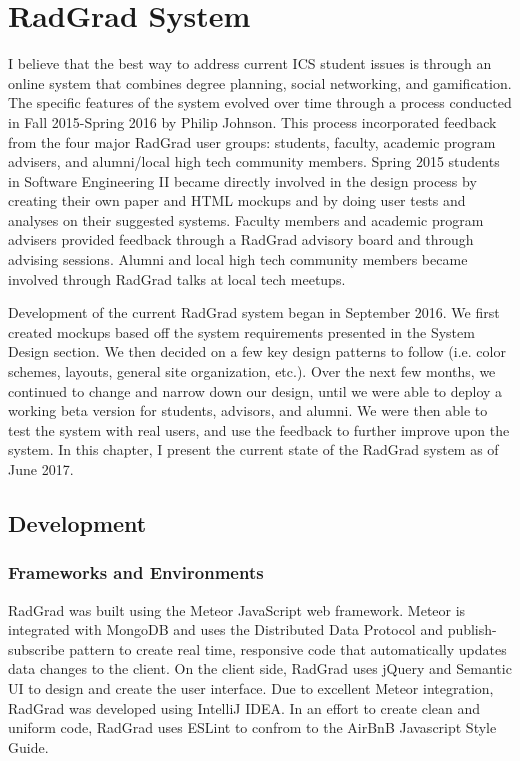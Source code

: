 \chapter{RadGrad System}
\label{radgrad-system}

I believe that the best way to address current ICS student issues is through an online system that combines degree planning, social networking, and gamification. The specific features of the system evolved over time through a process conducted in Fall 2015-Spring 2016 by Philip Johnson. This process incorporated feedback from the four major RadGrad user groups: students, faculty, academic program advisers, and alumni/local high tech community members. Spring 2015 students in Software Engineering II became directly involved in the design process by creating their own paper and HTML mockups and by doing user tests and analyses on their suggested systems. Faculty members and academic program advisers provided feedback through a RadGrad advisory board and through advising sessions. Alumni and local high tech community members became involved through RadGrad talks at local tech meetups. 

Development of the current RadGrad system began in September 2016. We first created mockups based off the system requirements presented in the System Design section. We then decided on a few key design patterns to follow (i.e. color schemes, layouts, general site organization, etc.). Over the next few months, we continued to change and narrow down our design, until we were able to deploy a working beta version for students, advisors, and alumni. We were then able to test the system with real users, and use the feedback to further improve upon the system. In this chapter, I present the current state of the RadGrad system as of June 2017.
\vspace{5mm}
\section{Development}
\subsection{Frameworks and Environments}

RadGrad was built using the Meteor JavaScript web framework. Meteor is integrated with MongoDB and uses the Distributed Data Protocol and publish-subscribe pattern to create real time, responsive code that automatically updates data changes to the client. On the client side, RadGrad uses jQuery and Semantic UI to design and create the user interface. Due to excellent Meteor integration, RadGrad was developed using IntelliJ IDEA. In an effort to create clean and uniform code, RadGrad uses ESLint to confrom to the AirBnB Javascript Style Guide. 


